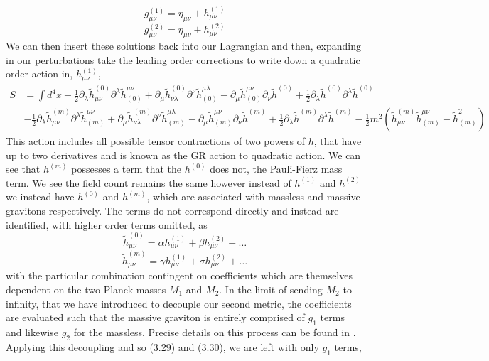 \documentclass[11pt]{report}
\numberwithin{equation}{chapter}
\begin{document}
\begin{equation}
    g_{\mu\nu}^{(1)}=\eta_{\mu\nu}+h_{\mu\nu}^{(1)}
\end{equation}
\begin{equation}
    g_{\mu\nu}^{(2)}=\eta_{\mu\nu}+h_{\mu\nu}^{(2)}
\end{equation}
We can then insert these solutions back into our Lagrangian and then, expanding in our perturbations take the leading order corrections to write down a quadratic order action in, $h_{\mu\nu}^{(1)}$, 
\begin{align}
    S&=\int d^4 x -\frac{1}{2}\partial_{\lambda}\tilde{h}_{\mu\nu}^{(0)}\partial^{\lambda}\tilde{h}^{\mu\nu}_{(0)}+\partial_{\mu}\tilde{h}_{\nu\lambda}^{(0)}\partial^{\nu}\tilde{h}^{\mu\lambda}_{(0)} -\partial_{\mu}\tilde{h}^{\mu\nu}_{(0)}\partial_{\nu}\tilde{h}^{(0)} +\frac{1}{2}\partial_{\lambda}\tilde{h}^{(0)}\partial^{\lambda}\tilde{h}^{(0)} \\ \nonumber
    &-\frac{1}{2}\partial_{\lambda}\tilde{h}_{\mu\nu}^{(m)}\partial^{\lambda}\tilde{h}^{\mu\nu}_{(m)}+\partial_{\mu}\tilde{h}_{\nu\lambda}^{(m)}\partial^{\nu}\tilde{h}^{\mu\lambda}_{(m)}-\partial_{\mu}\tilde{h}^{\mu\nu}_{(m)}\partial_{\nu}\tilde{h}^{(m)} +\frac{1}{2}\partial_{\lambda}\tilde{h}^{(m)}\partial^{\lambda}\tilde{h}^{(m)}-\frac{1}{2}m^2\left(\tilde{h}_{\mu\nu}^{(m)}\tilde{h}^{\mu\nu}_{(m)}-\tilde{h}_{(m)}^2\right)
\end{align}
This action includes all possible tensor contractions of two powers of $h$, that have up to two derivatives\cite{Kurts_review} and is known as the GR action to quadratic action. We can see that $h^{(m)}$ possesses a term that the $h^{(0)}$ does not, the Pauli-Fierz mass term. We see the field count remains the same however instead of $h^{(1)}$ and $h^{(2)}$ we instead have $h^{(0)}$ and $h^{(m)}$, which are associated with massless and massive gravitons respectively. The terms do not correspond directly and instead are identified, with higher order terms omitted, as
\begin{equation}
    \tilde{h}^{(0)}_{\mu\nu}=\alpha h^{(1)}_{\mu\nu} + \beta h^{(2)}_{\mu\nu} + \dots
\end{equation}
\begin{equation}
    \tilde{h}^{(m)}_{\mu\nu}=\gamma h^{(1)}_{\mu\nu} + \sigma h^{(2)}_{\mu\nu}+\dots
\end{equation}
with the particular combination contingent on coefficients which are themselves dependent on the two Planck masses $M_1$ and $M_2$. In the limit of sending $M_2$ to infinity, that we have introduced to decouple our second metric, the coefficients are evaluated such that the massive graviton is entirely comprised of $g_1$ terms and likewise $g_2$ for the massless. Precise details on this process can be found in \cite{Kurts_review}. Applying this decoupling and so (3.29) and (3.30), we are left with only $g_1$ terms,
\end{document}

